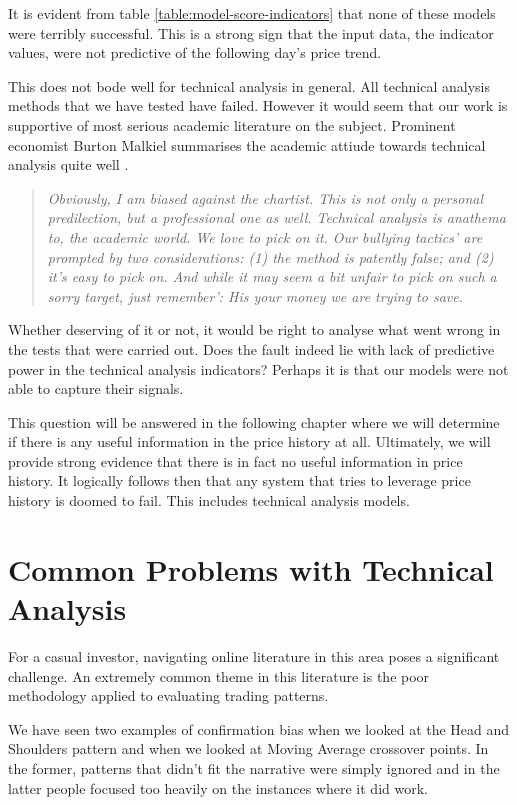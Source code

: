 \documentclass{report}
\begin{document}
It is evident from table \ref{table:model-score-indicators} that none of these models were terribly successful. This is a strong sign that the input data, the indicator values, were not predictive of the following day's price trend.

This does not bode well for technical analysis in general. All technical analysis methods that we have tested have failed. However it would seem that our work is supportive of most serious academic literature on the subject. Prominent economist Burton Malkiel summarises the academic attiude towards technical analysis quite well \cite{malkielrandomwalk}.

\begin{quotation}
\textit{Obviously, I am biased against the chartist. This is not only a personal predilection, but a professional one as well. Technical analysis is anathema to, the academic world. We love
to pick on it. Our bullying tactics' are prompted by two considerations: (1) the method is
patently false; and (2) it's easy to pick on. And while it may seem a bit unfair to pick on
such a sorry target, just remember': His your money we are trying to save.}  
\end{quotation}

Whether deserving of it or not, it would be right to analyse what went wrong in the tests that were carried out. Does the fault indeed lie with lack of predictive power in the technical analysis indicators? Perhaps it is that our models were not able to capture their signals.

This question will be answered in the following chapter where we will determine if there is any useful information in the price history at all. Ultimately, we will provide strong evidence that there is in fact no useful information in price history. It logically follows then that any system that tries to leverage price history is doomed to fail. This includes technical analysis models.

\section{Common Problems with Technical Analysis}

For a casual investor, navigating online literature in this area poses a significant challenge. An extremely common theme in this literature is the poor methodology applied to evaluating trading patterns.

We have seen two examples of confirmation bias when we looked at the Head and Shoulders pattern and when we looked at Moving Average crossover points. In the former, patterns that didn't fit the narrative were simply ignored and in the latter people focused too heavily on the instances where it did work.
\end{document}
